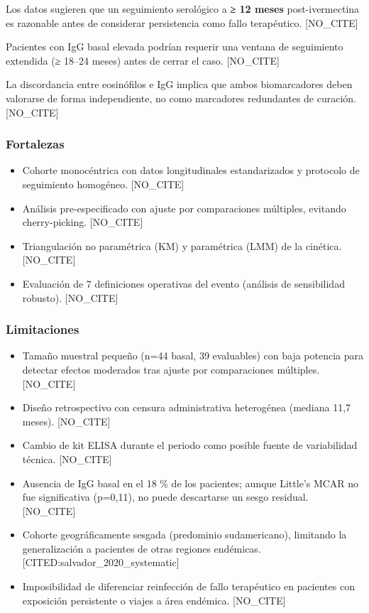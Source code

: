 \documentclass[
  spanish,
  12pt,
  a4paper,
]{article}
\providecommand{\tightlist}{%
  \setlength{\itemsep}{0pt}\setlength{\parskip}{0pt}}
\begin{document}
Los datos sugieren que un seguimiento serológico a \textbf{≥ 12 meses}
post-ivermectina es razonable antes de considerar persistencia como
fallo terapéutico. {[}NO\_CITE{]}

Pacientes con IgG basal elevada podrían requerir una ventana de
seguimiento extendida (≥ 18--24 meses) antes de cerrar el caso.
{[}NO\_CITE{]}

La discordancia entre eosinófilos e IgG implica que ambos biomarcadores
deben valorarse de forma independiente, no como marcadores redundantes
de curación. {[}NO\_CITE{]}

\subsubsection{Fortalezas}\label{fortalezas}

\begin{itemize}
\tightlist
\item
  Cohorte monocéntrica con datos longitudinales estandarizados y
  protocolo de seguimiento homogéneo. {[}NO\_CITE{]}
\item
  Análisis pre-especificado con ajuste por comparaciones múltiples,
  evitando cherry-picking. {[}NO\_CITE{]}
\item
  Triangulación no paramétrica (KM) y paramétrica (LMM) de la cinética.
  {[}NO\_CITE{]}
\item
  Evaluación de 7 definiciones operativas del evento (análisis de
  sensibilidad robusto). {[}NO\_CITE{]}
\end{itemize}

\subsubsection{Limitaciones}\label{limitaciones}

\begin{itemize}
\tightlist
\item
  Tamaño muestral pequeño (n=44 basal, 39 evaluables) con baja potencia
  para detectar efectos moderados tras ajuste por comparaciones
  múltiples. {[}NO\_CITE{]}
\item
  Diseño retrospectivo con censura administrativa heterogénea (mediana
  11,7 meses). {[}NO\_CITE{]}
\item
  Cambio de kit ELISA durante el periodo como posible fuente de
  variabilidad técnica. {[}NO\_CITE{]}
\item
  Ausencia de IgG basal en el 18 \% de los pacientes; aunque Little's
  MCAR no fue significativa (p=0,11), no puede descartarse un sesgo
  residual. {[}NO\_CITE{]}
\item
  Cohorte geográficamente sesgada (predominio sudamericano), limitando
  la generalización a pacientes de otras regiones endémicas.
  {[}CITED:salvador\_2020\_systematic{]}
\item
  Imposibilidad de diferenciar reinfección de fallo terapéutico en
  pacientes con exposición persistente o viajes a área endémica.
  {[}NO\_CITE{]}
\end{itemize}
\end{document}
